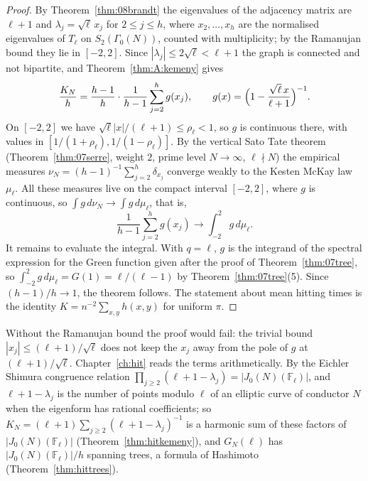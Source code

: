 \begin{proof}
By Theorem~\ref{thm:08brandt} the eigenvalues of the adjacency matrix are $\ell+1$ and $\lambda_j=\sqrt\ell\,x_j$ for $2\le j\le h$, where $x_2,\dots,x_h$ are the normalised eigenvalues of $T_\ell$ on $S_2(\Gamma_0(N))$, counted with multiplicity; by the Ramanujan bound they lie in $[-2,2]$. Since $|\lambda_j|\le2\sqrt\ell<\ell+1$ the graph is connected and not bipartite, and Theorem~\ref{thm:A:kemeny} gives
\[
\frac{K_N}{h}=\frac{h-1}{h}\cdot\frac{1}{h-1}\sum_{j=2}^hg(x_j),\qquad g(x)=\Bigl(1-\frac{\sqrt\ell\,x}{\ell+1}\Bigr)^{-1}.
\]
On $[-2,2]$ we have $\sqrt\ell|x|/(\ell+1)\le\rho_\ell<1$, so $g$ is continuous there, with values in $[1/(1+\rho_\ell),1/(1-\rho_\ell)]$. By the vertical Sato Tate theorem (Theorem~\ref{thm:07serre}, weight $2$, prime level $N\to\infty$, $\ell\nmid N$) the empirical measures $\nu_N=(h-1)^{-1}\sum_{j=2}^h\delta_{x_j}$ converge weakly to the Kesten McKay law $\mu_\ell$. All these measures live on the compact interval $[-2,2]$, where $g$ is continuous, so $\int g\,d\nu_N\to\int g\,d\mu_\ell$, that is,
\[
\frac{1}{h-1}\sum_{j=2}^hg(x_j)\longrightarrow\int_{-2}^2g\,d\mu_\ell .
\]
It remains to evaluate the integral. With $q=\ell$, $g$ is the integrand of the spectral expression for the Green function given after the proof of Theorem~\ref{thm:07tree}, so $\int_{-2}^2g\,d\mu_\ell=G(1)=\ell/(\ell-1)$ by Theorem~\ref{thm:07tree}(5). Since $(h-1)/h\to1$, the theorem follows. The statement about mean hitting times is the identity $K=n^{-2}\sum_{x,y}h(x,y)$ for uniform $\pi$.
\end{proof}

Without the Ramanujan bound the proof would fail: the trivial bound $|x_j|\le(\ell+1)/\sqrt\ell$ does not keep the $x_j$ away from the pole of $g$ at $(\ell+1)/\sqrt\ell$. Chapter~\ref{ch:hit} reads the terms arithmetically. By the Eichler Shimura congruence relation $\prod_{j\ge2}(\ell+1-\lambda_j)=|J_0(N)(\mathbb F_\ell)|$, and $\ell+1-\lambda_j$ is the number of points modulo $\ell$ of an elliptic curve of conductor $N$ when the eigenform has rational coefficients; so $K_N=(\ell+1)\sum_{j\ge2}(\ell+1-\lambda_j)^{-1}$ is a harmonic sum of these factors of $|J_0(N)(\mathbb F_\ell)|$ (Theorem~\ref{thm:hitkemeny}), and $G_N(\ell)$ has $|J_0(N)(\mathbb F_\ell)|/h$ spanning trees, a formula of Hashimoto (Theorem~\ref{thm:hittrees}).

